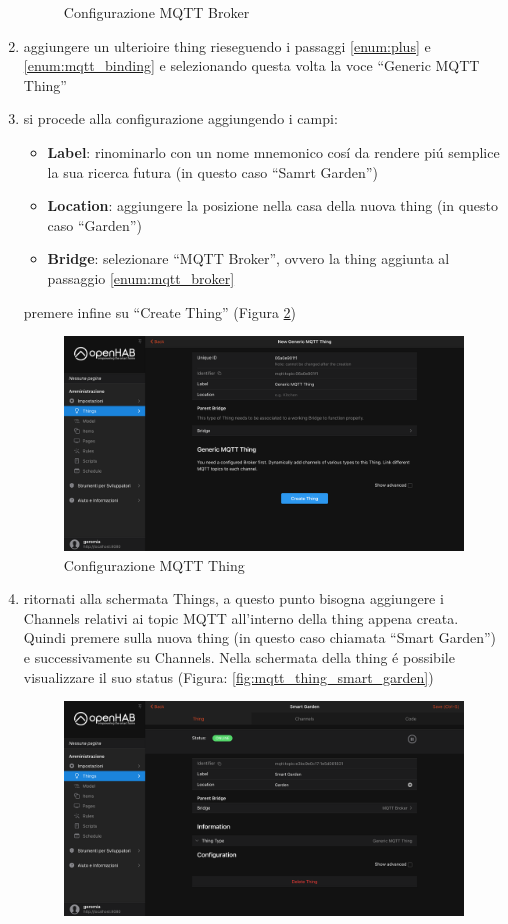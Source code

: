 \begin{enumerate}
\begin{figure}
        \caption{Configurazione MQTT Broker}
        \label{fig:mqtt_broker_config}
    \end{figure}
    \item aggiungere un ulterioire thing rieseguendo i passaggi \ref{enum:plus} e \ref{enum:mqtt_binding} e selezionando questa volta la voce ``Generic MQTT Thing''
    \item si procede alla configurazione aggiungendo i campi:
    \begin{itemize}
        \item \textbf{Label}: rinominarlo con un nome mnemonico cos\'i da rendere pi\'u semplice la sua ricerca futura (in questo caso ``Samrt Garden'')
        \item \textbf{Location}: aggiungere la posizione nella casa della nuova thing (in questo caso ``Garden'')
        \item \textbf{Bridge}: selezionare ``MQTT Broker'', ovvero la thing aggiunta al passaggio \ref{enum:mqtt_broker}
    \end{itemize}
    premere infine su ``Create Thing'' (Figura \ref{fig:mqtt_thing_config})
    \begin{figure}
        \centering
        \includegraphics[width=12cm]{Immagini/mqtt_thing_config}
        \caption{Configurazione MQTT Thing}
        \label{fig:mqtt_thing_config}
    \end{figure}
    \item ritornati alla schermata Things, a questo punto bisogna aggiungere i Channels relativi ai topic MQTT all'interno della thing appena creata. Quindi premere sulla nuova thing (in questo caso chiamata ``Smart Garden'') e successivamente su Channels. Nella schermata della thing \'e possibile visualizzare il suo status (Figura: \ref{fig:mqtt_thing_smart_garden})
    \begin{figure}
        \centering
        \includegraphics[width=12cm]{Immagini/mqtt_thing_smart_garden}

\end{figure}
\end{enumerate}

